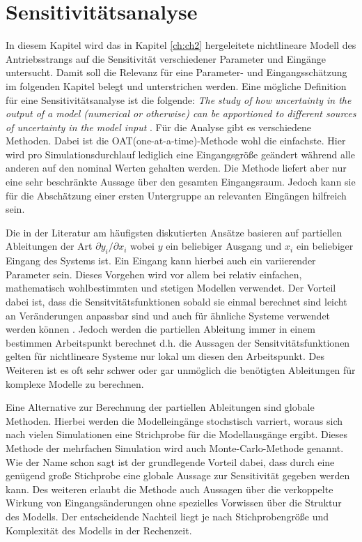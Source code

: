 \chapter{Sensitivitätsanalyse}\label{ch:Sensitivity}
In diesem Kapitel wird das in Kapitel \ref{ch:ch2} hergeleitete nichtlineare Modell des Antriebsstrangs auf die Sensitivität verschiedener Parameter und Eingänge untersucht. Damit soll die Relevanz für eine Parameter- und Eingangsschätzung im folgenden Kapitel belegt und unterstrichen werden.
Eine mögliche Definition für eine Sensitivitätsanalyse ist die folgende: \emph{The study of how uncertainty in the output of a model (numerical or otherwise) can be apportioned to different sources of uncertainty in the model input} \cite{Saltelli.2004}.
Für die Analyse gibt es verschiedene Methoden. Dabei ist die OAT(one-at-a-time)-Methode wohl die einfachste. Hier wird pro Simulationsdurchlauf lediglich eine Eingangsgröße geändert während alle anderen auf den nominal Werten gehalten werden. Die Methode liefert aber nur eine sehr beschränkte Aussage über den gesamten Eingangsraum. Jedoch kann sie für die Abschätzung einer ersten Untergruppe an relevanten Eingängen hilfreich sein.    

 Die in der Literatur am häufigsten diskutierten Ansätze basieren auf partiellen Ableitungen der Art $\partial y_i/\partial x_i$ wobei $y$ ein beliebiger Ausgang und $x_i$ ein beliebiger Eingang des Systems ist. Ein Eingang kann hierbei auch ein variierender Parameter sein. Dieses Vorgehen wird vor allem bei relativ einfachen, mathematisch wohlbestimmten und stetigen Modellen verwendet. Der Vorteil dabei ist, dass die Sensitvitätsfunktionen sobald sie einmal berechnet sind leicht an Veränderungen anpassbar sind und auch für ähnliche Systeme verwendet werden können \cite{Karnavas.1993}. Jedoch werden die partiellen Ableitung immer in einem bestimmen Arbeitspunkt berechnet d.h. die Aussagen der Sensitvitätsfunktionen gelten für nichtlineare Systeme nur lokal um diesen den Arbeitspunkt. Des Weiteren ist es oft sehr schwer oder gar unmöglich die benötigten Ableitungen für komplexe Modelle zu berechnen.

Eine Alternative zur Berechnung der partiellen Ableitungen sind globale Methoden. Hierbei werden die Modelleingänge stochstisch varriert, woraus sich nach vielen Simulationen eine Strichprobe für die Modellausgänge ergibt. Dieses Methode der mehrfachen Simulation wird auch Monte-Carlo-Methode genannt. Wie der Name schon sagt ist der grundlegende Vorteil dabei, dass durch eine genügend große Stichprobe eine globale Aussage zur Sensitivität gegeben werden kann. Des weiteren erlaubt die Methode auch Aussagen über die verkoppelte Wirkung von Eingangsänderungen ohne spezielles Vorwissen über die Struktur des Modells. Der entscheidende Nachteil liegt je nach Stichprobengröße und Komplexität des Modells in der Rechenzeit.      

